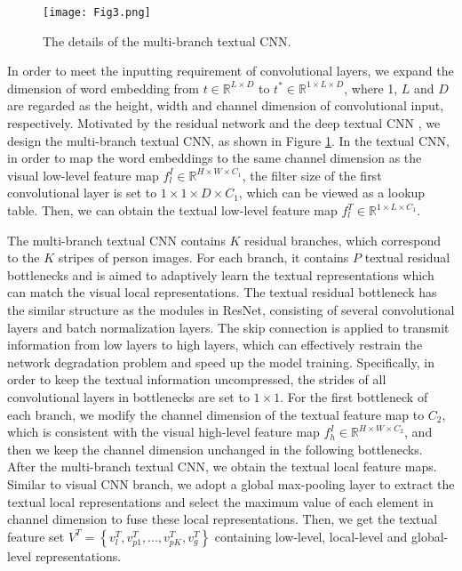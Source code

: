 \documentclass[review]{elsarticle}
\begin{document}
\begin{figure}[!t]
\centering
\texttt{[image: Fig3.png]}\\
\caption{The details of the multi-branch textual CNN.}
\label{fig3}
\end{figure}

In order to meet the inputting requirement of convolutional layers, we expand the dimension of word embedding from $t \in {\mathbb{R}^{L \times D}}$ to ${t^ * } \in {\mathbb{R}^{1 \times L \times D}}$, where 1, $L$ and $D$ are regarded as the height, width and channel dimension of convolutional input, respectively. Motivated by the residual network \cite{47} and the deep textual CNN \cite{12}, we design the multi-branch textual CNN, as shown in Figure \ref{fig3}. In the textual CNN, in order to map the word embeddings to the same channel dimension as the visual low-level feature map $f_l^I \in {\mathbb{R}^{H \times W \times {C_1}}}$, the filter size of the first convolutional layer is set to $1 \times 1 \times D \times {C_1}$, which can be viewed as a lookup table. Then, we can obtain the textual low-level feature map $f_l^T \in {\mathbb{R}^{1 \times L \times {C_1}}}$. 

The multi-branch textual CNN contains $K$ residual branches, which correspond to the $K$ stripes of person images. For each branch, it contains $P$ textual residual bottlenecks and is aimed to adaptively learn the textual representations which can match the visual local representations. The textual residual bottleneck has the similar structure as the modules in ResNet, consisting of several convolutional layers and batch normalization layers. The skip connection is applied to transmit information from low layers to high layers, which can effectively restrain the network degradation problem and speed up the model training. Specifically, in order to keep the textual information uncompressed,
the strides of all convolutional layers in bottlenecks are set to $1 \times 1$. 
For the first bottleneck of each branch, we modify the channel dimension of the textual feature map to ${C_2}$, which is consistent with the visual high-level feature map $f_h^I \in {\mathbb{R}^{H \times W \times {C_2}}}$, and then we keep the channel dimension unchanged in the following bottlenecks. After the multi-branch textual CNN, we obtain the textual local feature maps. Similar to visual CNN branch, we adopt a global max-pooling layer to extract the textual local representations and select the maximum value of each element in channel dimension to fuse these local representations. Then, we get the textual feature set ${V^T} = \left\{ {v_l^T,v_{p1}^T,...,v_{pK}^T,v_g^T} \right\}$ containing low-level, local-level and global-level representations.
\end{document}
